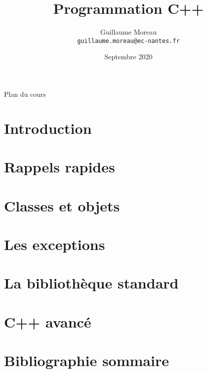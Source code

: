 \documentclass[allowframebreaks,xcolor=dvipsnames]{beamer}
\title[Option RV / CPLUS] %
{Programmation C++}
\author[G. Moreau]{Guillaume Moreau\\
\texttt{guillaume.moreau@ec-nantes.fr}}
\institute[Ecole Centrale de Nantes] %
{
  Ecole Centrale de Nantes
}
\date %
{Septembre 2020}
\begin{document}
\begin{frame}
  \titlepage
\end{frame}

\begin{frame}[allowframebreaks]{Plan du cours}
  \tableofcontents[hideallsubsections]
\end{frame}


\section{Introduction}



\section{Rappels rapides}



\section{Classes et objets}




\section{Les exceptions}
\label{sec:exceptions}



\section{La bibliothèque standard}



\section{C++ avancé}




\section{Bibliographie sommaire}
\end{document}
